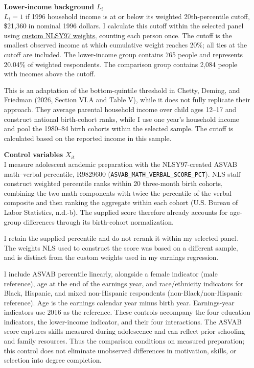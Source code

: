 \documentclass[12pt,letterpaper]{article}
\begin{document}
\textbf{Lower-income background $L_i$}\\
$L_i=1$ if 1996 household income is at or below its weighted 20th-percentile cutoff,
\$21,360 in nominal 1996 dollars. I calculate this cutoff within the selected panel using
\href{https://www.nlsinfo.org/content/weights/nlsy97}{custom NLSY97 weights}, counting
each person once. The cutoff is the smallest observed income at which cumulative
weight reaches 20\%; all ties at the cutoff are included. The lower-income group
contains 765 people and represents 20.04\% of weighted respondents. The comparison
group contains 2,084 people with incomes above the cutoff.\newline

This is an adaptation of the bottom-quintile threshold in Chetty, Deming, and
Friedman (2026, Section VI.A and Table V), while it does not fully replicate 
their approach. They average parental household income over child ages 12--17 
and construct national birth-cohort ranks, while I use one year's household 
income and pool the 1980--84 birth cohorts within the selected sample. The cutoff 
is calculated based on the reported income in this sample.\newline

\textbf{Control variables $X_{it}$}\\
I measure adolescent academic preparation with the NLSY97-created ASVAB
math--verbal percentile, R9829600
(\texttt{ASVAB\_MATH\_VERBAL\_SCORE\_PCT}). NLS staff construct weighted 
percentile ranks within 20 three-month birth cohorts, combining the two math 
components with twice the percentile of the verbal composite and then ranking 
the aggregate within each cohort (U.S. Bureau of Labor Statistics, n.d.-b). 
The supplied score therefore already accounts for age-group differences through
its birth-cohort normalization.\newline

I retain the supplied percentile and do not rerank it within my selected panel. 
The weights NLS used to construct the score was based on a different sample, and is 
distinct from the custom weights used in my earnings regression.\newline

I include ASVAB percentile linearly, alongside a female indicator (male reference),
age at the end of the earnings year, and race/ethnicity indicators for Black,
Hispanic, and mixed non-Hispanic respondents (non-Black/non-Hispanic reference).
Age is the earnings calendar year minus birth year. Earnings-year indicators use
2016 as the reference. These controls accompany the four education indicators,
the lower-income indicator, and their four interactions. The ASVAB score captures skills measured during
adolescence and can reflect prior schooling and family resources. Thus the
comparison conditions on measured preparation; this control does not eliminate
unobserved differences in motivation, skills, or selection into degree completion.\newline
\end{document}
